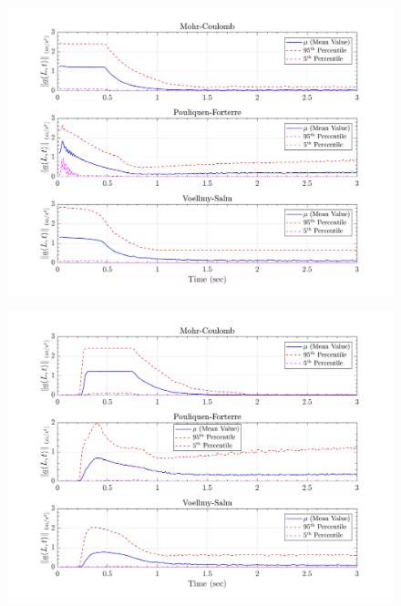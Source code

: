 \documentclass{article}
\begin{document}
\begin{figure}[H]
	\begin{minipage}[b]{0.5\linewidth}
    	\centering
    	\includegraphics[width=1\textwidth]{InclinedPlane/LocalRecords/Records/accel_L1.png}
    	\label{fig:Ramp-L1-Acc}
	\end{minipage}
	\begin{minipage}[b]{0.5\linewidth}
		\centering
		\includegraphics[width=1\textwidth]{InclinedPlane/LocalRecords/Records/accel_L8.png}
    	\label{fig:Ramp-L2-Acc}
    \end{minipage}
    

\end{figure}
\end{document}
